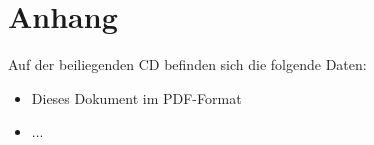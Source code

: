 
\chapter*{Anhang}

Auf der beiliegenden CD befinden sich die folgende Daten:
\begin{itemize}
	\item Dieses Dokument im PDF-Format
	\item ...
\end{itemize}